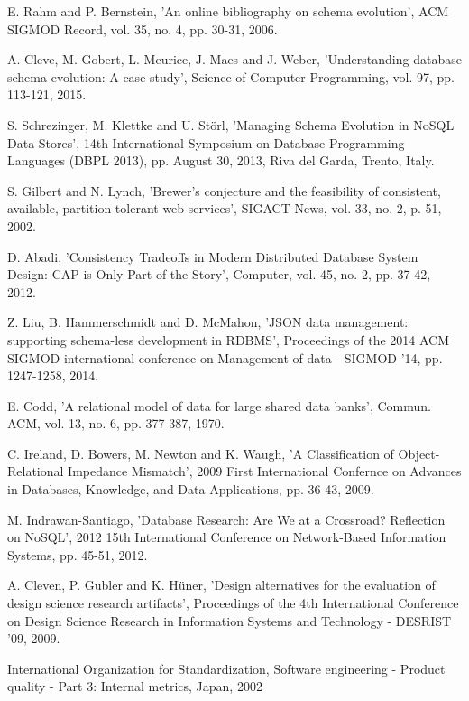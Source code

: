 \begin{thebibliography}{69}
 E. Rahm and P. Bernstein, 'An online bibliography on schema evolution', ACM SIGMOD Record, vol. 35, no. 4, pp. 30-31, 2006.

 A. Cleve, M. Gobert, L. Meurice, J. Maes and J. Weber, 'Understanding database schema evolution: A case study', Science of Computer Programming, vol. 97, pp. 113-121, 2015.

 S. Schrezinger, M. Klettke and U. Störl, 'Managing Schema Evolution in NoSQL Data Stores', 14th International Symposium on Database Programming Languages (DBPL 2013), pp.  August 30, 2013, Riva del Garda, Trento, Italy.

 S.  Gilbert and N.  Lynch, 'Brewer's conjecture and the feasibility of consistent, available, partition-tolerant web services', SIGACT News, vol. 33, no. 2, p. 51, 2002.

 D.  Abadi, 'Consistency Tradeoffs in Modern Distributed Database System Design: CAP is Only Part of the Story', Computer, vol. 45, no. 2, pp. 37-42, 2012.

Z.  Liu, B.  Hammerschmidt and D.  McMahon, 'JSON data management: supporting schema-less development in RDBMS', Proceedings of the 2014 ACM SIGMOD international conference on Management of data - SIGMOD '14, pp. 1247-1258, 2014.

 E.  Codd, 'A relational model of data for large shared data banks', Commun. ACM, vol. 13, no. 6, pp. 377-387, 1970.

 C.  Ireland, D.  Bowers, M.  Newton and K.  Waugh, 'A Classification of Object-Relational Impedance Mismatch', 2009 First International Confernce on Advances in Databases, Knowledge, and Data Applications, pp. 36-43, 2009.

 M.  Indrawan-Santiago, 'Database Research: Are We at a Crossroad? Reflection on NoSQL', 2012 15th International Conference on Network-Based Information Systems, pp. 45-51, 2012.

 A.  Cleven, P.  Gubler and K.  Hüner, 'Design alternatives for the evaluation of design science research artifacts', Proceedings of the 4th International Conference on Design Science Research in Information Systems and Technology - DESRIST '09, 2009.

 International Organization for Standardization, Software engineering - Product quality - Part 3: Internal metrics, Japan, 2002


\end{thebibliography}
